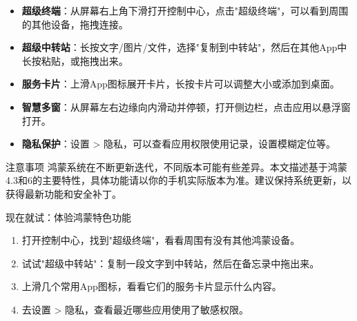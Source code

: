 
\begin{itemize}
  \item \textbf{超级终端}：从屏幕右上角下滑打开控制中心，点击"超级终端"，可以看到周围的其他设备，拖拽连接。
  \item \textbf{超级中转站}：长按文字/图片/文件，选择"复制到中转站"，然后在其他App中长按粘贴，或拖拽出来。
  \item \textbf{服务卡片}：上滑App图标展开卡片，长按卡片可以调整大小或添加到桌面。
  \item \textbf{智慧多窗}：从屏幕左右边缘向内滑动并停顿，打开侧边栏，点击应用以悬浮窗打开。
  \item \textbf{隐私保护}：设置 > 隐私，可以查看应用权限使用记录，设置模糊定位等。
\end{itemize}

\begin{tcbwarn}{注意事项}
鸿蒙系统在不断更新迭代，不同版本可能有些差异。本文描述基于鸿蒙4.3和6的主要特性，具体功能请以你的手机实际版本为准。建议保持系统更新，以获得最新功能和安全补丁。

\end{tcbwarn}

\begin{tcbpractice}{现在就试：体验鸿蒙特色功能}
\begin{enumerate}
  \item 打开控制中心，找到"超级终端"，看看周围有没有其他鸿蒙设备。
  \item 试试"超级中转站"：复制一段文字到中转站，然后在备忘录中拖出来。
  \item 上滑几个常用App图标，看看它们的服务卡片显示什么内容。
  \item 去设置 > 隐私，查看最近哪些应用使用了敏感权限。
\end{enumerate}

\end{tcbpractice}
